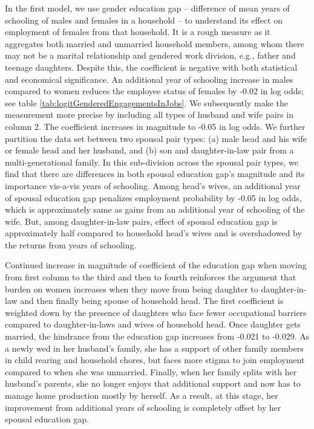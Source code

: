  

In the first model, we use gender education gap -- difference of mean years of schooling of males and females in a household -- to understand its effect on employment of females from that household. It is a rough measure as it aggregates both married and unmarried  household members, among whom there may not be a marital relationship and gendered work division, e.g., father and teenage daughters. Despite this, the coefficient is negative with both statistical and economical significance. An additional year of schooling increase in males compared to women reduces the employee status of females by -0.02 in log odds; see table \ref{tab:logitGenderedEngagementsInJobs}. We subsequently make the measurement more precise by including all types of husband and wife pairs in column 2. The coefficient increases in magnitude to -0.05 in log odds. We further partition the data set between two spousal pair types: (a) male head and his wife or female head and her husband, and (b) son and daughter-in-law pair from a multi-generational family. In this sub-division across the spousal pair types, we find that there are differences in  both spousal education gap's magnitude and its importance vis-a-vis years of schooling. Among head's wives, an additional year of spousal education gap penalizes employment probability by -0.05 in log odds, which is approximately same as gains from an additional year of schooling of the wife. But, among daughter-in-law pairs, effect of spousal education gap is approximately half compared to household head's wives and is overshadowed by the returns from years of schooling.\par

Continued increase in magnitude of coefficient of the education gap when moving from first column to the third and then to fourth reinforces the argument that burden on women increases when they move from being daughter to daughter-in-law and then finally being spouse of household head. The first coefficient is weighted down by the presence of daughters who face fewer occupational barriers compared to daughter-in-laws and wives of household head. Once daughter gets married, the hindrance from the education gap increases from -0.021 to -0.029. As a newly wed in her husband's family, she has a support of other family members in child rearing and household chores, but faces more stigma to join employment compared to when she was unmarried. Finally, when her family splits with her husband's parents, she no longer enjoys that additional support and now has to manage home production mostly by herself. As a result, at this stage, her improvement from additional years of schooling is completely offset by her spousal education gap.\par

